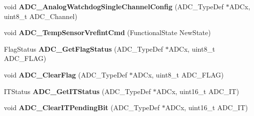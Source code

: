 \begin{DoxyCompactItemize}
\item 
\hypertarget{group__ADC__Exported__Functions_ga03cef3d12292ffa2b8520524d5b0226c}{
void {\bfseries ADC\_\-AnalogWatchdogSingleChannelConfig} (ADC\_\-TypeDef $\ast$ADCx, uint8\_\-t ADC\_\-Channel)}
\label{group__ADC__Exported__Functions_ga03cef3d12292ffa2b8520524d5b0226c}

\item 
\hypertarget{group__ADC__Exported__Functions_ga848682e2d7d3de9f8cf03ffa4c11f0b5}{
void {\bfseries ADC\_\-TempSensorVrefintCmd} (FunctionalState NewState)}
\label{group__ADC__Exported__Functions_ga848682e2d7d3de9f8cf03ffa4c11f0b5}

\item 
\hypertarget{group__ADC__Exported__Functions_gaa12546e51ec905c90a3aada432bd4633}{
FlagStatus {\bfseries ADC\_\-GetFlagStatus} (ADC\_\-TypeDef $\ast$ADCx, uint8\_\-t ADC\_\-FLAG)}
\label{group__ADC__Exported__Functions_gaa12546e51ec905c90a3aada432bd4633}

\item 
\hypertarget{group__ADC__Exported__Functions_gaf34f36798f811b4a41321ea2d12118d4}{
void {\bfseries ADC\_\-ClearFlag} (ADC\_\-TypeDef $\ast$ADCx, uint8\_\-t ADC\_\-FLAG)}
\label{group__ADC__Exported__Functions_gaf34f36798f811b4a41321ea2d12118d4}

\item 
\hypertarget{group__ADC__Exported__Functions_gaa1d3b910a83dbf14d4f68c8eef058612}{
ITStatus {\bfseries ADC\_\-GetITStatus} (ADC\_\-TypeDef $\ast$ADCx, uint16\_\-t ADC\_\-IT)}
\label{group__ADC__Exported__Functions_gaa1d3b910a83dbf14d4f68c8eef058612}

\item 
\hypertarget{group__ADC__Exported__Functions_ga601c6a67bd883eb631ecc7aa5e999b9c}{
void {\bfseries ADC\_\-ClearITPendingBit} (ADC\_\-TypeDef $\ast$ADCx, uint16\_\-t ADC\_\-IT)}
\label{group__ADC__Exported__Functions_ga601c6a67bd883eb631ecc7aa5e999b9c}

\end{DoxyCompactItemize}
